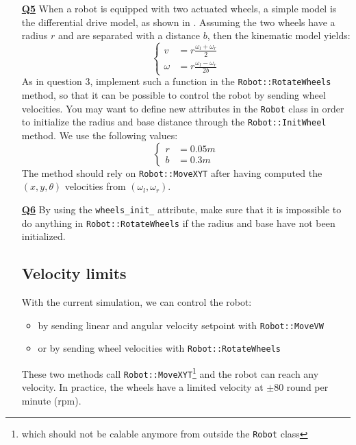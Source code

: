 \documentclass{ecnreport}
\begin{document}
\begin{itemize}
\medskip\item[\textbf{\underline{Q5}}] When a robot is equipped with two actuated wheels, a simple model is the differential drive model, as shown in . Assuming the two wheels have a radius $r$ and are separated with a distance $b$, then the kinematic model yields:
\begin{equation}\label{eq:dk}
\left\{\begin{array}{ll}
v &= \displaystyle r \frac{\omega_l + \omega_r}{2} \\
\omega &= \displaystyle r \frac{\omega_l - \omega_r}{2b}
\end{array}\right.
\end{equation}As in question 3, implement such a function in the \texttt{Robot::RotateWheels} method, so that it can be possible to control the robot by sending wheel velocities. You may want to define new attributes in the \texttt{Robot} class in order to initialize the radius and base distance through the \texttt{Robot::InitWheel} method. We use the following values:
\begin{equation}
\left\{\begin{array}{ll}
r &= 0.05 m \\
b &= 0.3 m
\end{array}\right.
\end{equation}
The method should rely on \texttt{Robot::MoveXYT} after having computed the $(x,y,\theta)$ velocities from $(\omega_l, \omega_r)$.

\medskip\item[\textbf{\underline{Q6}}] By using the \texttt{wheels\_init\_} attribute, make sure that it is impossible to do anything in \texttt{Robot::RotateWheels} if the radius and base have not been initialized.


\subsection{Velocity limits}

With the current simulation, we can control the robot:
\begin{itemize}
\item by sending linear and angular velocity setpoint with \texttt{Robot::MoveVW}
\item or by sending wheel velocities with \texttt{Robot::RotateWheels}
\end{itemize}

These two methods call \texttt{Robot::MoveXYT}\footnote{which should not be calable anymore from outside the \texttt{Robot} class} and the robot can reach any velocity. In practice, the wheels have a limited velocity at $\pm$80 round per minute (rpm).


\end{itemize}
\end{document}
